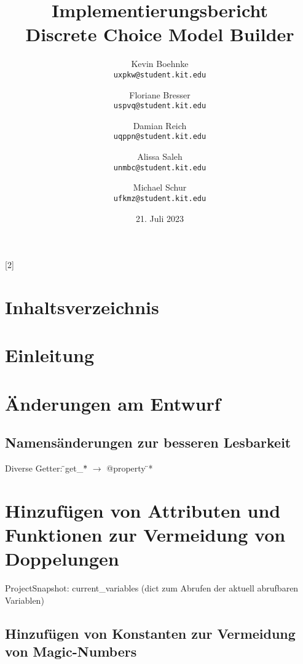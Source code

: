 \documentclass{article}
\title{Implementierungsbericht \\ \large Discrete Choice Model Builder}
\author{Kevin Boehnke \\ \texttt{uxpkw@student.kit.edu}
\and Floriane Bresser \\ \texttt{uspvq@student.kit.edu}
\and Damian Reich \\ \texttt{uqppn@student.kit.edu}
\and Alissa Saleh \\ \texttt{unmbc@student.kit.edu}
\and Michael Schur \\ \texttt{ufkmz@student.kit.edu}}
\date{21. Juli 2023}
\begin{document}
\maketitle
\thispagestyle{empty}
\newpage
\startcontents[maintableofcontents]
[2]{\section*{Inhaltsverzeichnis}}
\thispagestyle{empty}
\newpage
{}

\section{Einleitung}



\section{Änderungen am Entwurf}



\subsection{Namensänderungen zur besseren Lesbarkeit}

Diverse Getter: \"{}get\_{}*\"{} $\rightarrow$ @property \"{}*\"\\

\section{Hinzufügen von Attributen und Funktionen zur Vermeidung von Doppelungen}

ProjectSnapshot: current\_variables (dict zum Abrufen der aktuell abrufbaren Variablen)

\subsection{Hinzufügen von Konstanten zur Vermeidung von Magic-Numbers}
\end{document}
